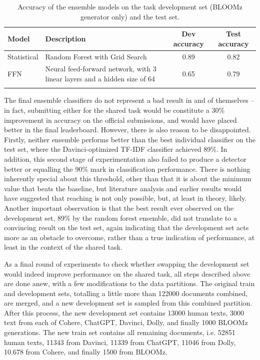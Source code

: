 \begin{table}[ht]
    \vspace{0.1cm}
    \centering
    \begin{tabular}{lp{150px}cc}
        \hline
        Model       & Description                                                               & Dev accuracy & Test accuracy \\
        \hline
        Statistical & Random Forest with Grid Search                                            & 0.89         & 0.82          \\
        FFN         & Neural feed-forward network, with 3 linear layers and a hidden size of 64 & 0.65         & 0.79          \\
        \hline
        \vspace{0.1cm}
    \end{tabular}
    \caption{Accuracy of the ensemble models on the task development set (BLOOMz generator only) and the test set.}
    \label{tab:ensemble-initial}
\end{table}

The final ensemble classifiers do not represent a bad result in and of themselves -- in fact, submitting either for the shared task would be constitute a 30\% improvement in accuracy on the official submissions, and would have placed better in the final leaderboard.
However, there is also reason to be disappointed.
Firstly, neither ensemble performs better than the best individual classifier on the test set, where the Davinci-optimized TF-IDF classifier achieved 89\%.
In addition, this second stage of experimentation also failed to produce a detector better or equalling the 90\% mark in classification performance.
There is nothing inherently special about this threshold, other than that it is about the minimum value that beats the baseline, but literature analysis and earlier results would have suggested that reaching is not only possible, but, at least in theory, likely.
Another important observation is that the best result ever observed on the development set, 89\% by the random forest ensemble, did not translate to a convincing result on the test set, again indicating that the development set acts more as an obstacle to overcome, rather than a true indication of performance, at least in the context of the shared task.

As a final round of experiments to check whether swapping the development set would indeed improve performance on the shared task, all steps described above are done anew, with a few modifications to the data partitions.
The original train and development sets, totalling a little more than 122000 documents combined, are merged, and a new development set is sampled from this combined partition.
After this process, the new development set contains 13000 human texts, 3000 text from each of Cohere, ChatGPT, Davinci, Dolly, and finally 1000 BLOOMz generations.
The new train set contains all remaining documents, i.e. 52851 human texts, 11343 from Davinci, 11339 from ChatGPT, 11046 from Dolly, 10.678 from Cohere, and finally 1500 from BLOOMz.

